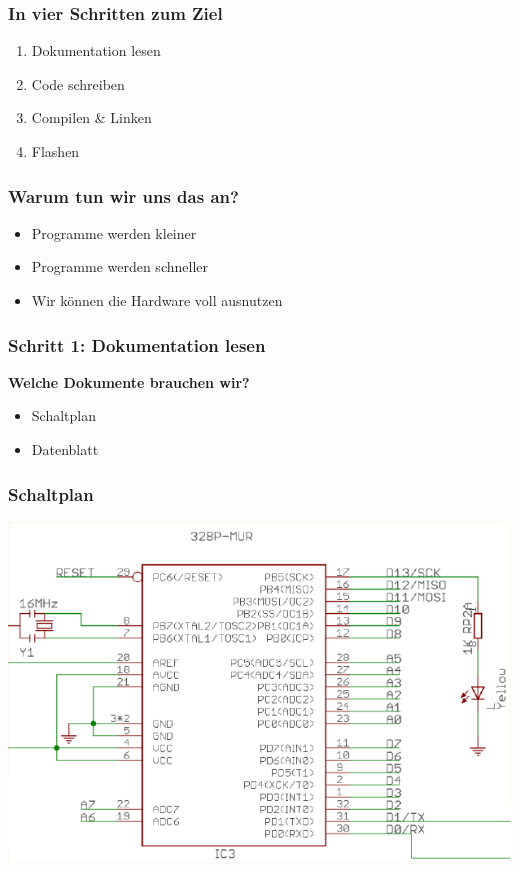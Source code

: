 \documentclass{beamer}
\begin{document}
\begin{frame}
\frametitle{In vier Schritten zum Ziel}
\begin{enumerate}
\item Dokumentation lesen
\item Code schreiben
\item Compilen \& Linken
\item Flashen
\end{enumerate}
\end{frame}

\begin{frame}
\frametitle{Warum tun wir uns das an?}
\begin{itemize}
\item Programme werden kleiner
\item Programme werden schneller
\item Wir können die Hardware voll ausnutzen
\end{itemize}
\end{frame}

\begin{frame}
\frametitle{Schritt 1: Dokumentation lesen}

\textbf{Welche Dokumente brauchen wir?}
\begin{itemize}
\item Schaltplan
\item Datenblatt
\end{itemize}
\end{frame}

\begin{frame}
\frametitle{Schaltplan}
\includegraphics{schematic.pdf}
\end{frame}
\end{document}
